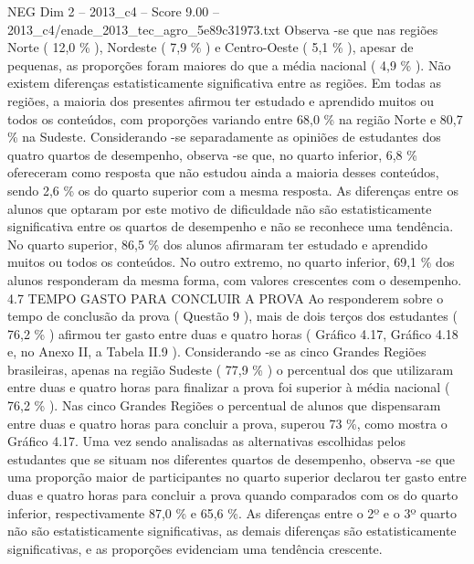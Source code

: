 \begin{textsample}{NEG Dim 2 – 2013\_c4 – Score 9.00 – 2013\_c4/enade\_2013\_tec\_agro\_5e89c31973.txt}
Observa -se que nas regiões Norte ( 12,0 \% ), Nordeste ( 7,9 \% ) e Centro-Oeste ( 5,1 \% ), apesar de pequenas, as proporções foram maiores do que a média nacional ( 4,9 \% ).
Não existem diferenças estatisticamente significativa entre as regiões.
Em todas as regiões, a maioria dos presentes afirmou ter estudado e aprendido muitos ou todos os conteúdos, com proporções variando entre 68,0 \% na região Norte e 80,7 \% na Sudeste.
Considerando -se separadamente as opiniões de estudantes dos quatro quartos de desempenho, observa -se que, no quarto inferior, 6,8 \% ofereceram como resposta que não estudou ainda a maioria desses conteúdos, sendo 2,6 \% os do quarto superior com a mesma resposta.
As diferenças entre os alunos que optaram por este motivo de dificuldade não são estatisticamente significativa entre os quartos de desempenho e não se reconhece uma tendência.
No quarto superior, 86,5 \% dos alunos afirmaram ter estudado e aprendido muitos ou todos os conteúdos.
No outro extremo, no quarto inferior, 69,1 \% dos alunos responderam da mesma forma, com valores crescentes com o desempenho. 4.7 TEMPO GASTO PARA CONCLUIR A PROVA Ao responderem sobre o tempo de conclusão da prova ( Questão 9 ), mais de dois terços dos estudantes ( 76,2 \% ) afirmou ter gasto entre duas e quatro horas ( Gráfico 4.17, Gráfico 4.18 e, no Anexo II, a Tabela II.9 ).
Considerando -se as cinco Grandes Regiões brasileiras, apenas na região Sudeste ( 77,9 \% ) o percentual dos que utilizaram entre duas e quatro horas para finalizar a prova foi superior à média nacional ( 76,2 \% ).
Nas cinco Grandes Regiões o percentual de alunos que dispensaram entre duas e quatro horas para concluir a prova, superou 73 \%, como mostra o Gráfico 4.17.
Uma vez sendo analisadas as alternativas escolhidas pelos estudantes que se situam nos diferentes quartos de desempenho, observa -se que uma proporção maior de participantes no quarto superior declarou ter gasto entre duas e quatro horas para concluir a prova quando comparados com os do quarto inferior, respectivamente 87,0 \% e 65,6 \%.
As diferenças entre o 2º e o 3º quarto não são estatisticamente significativas, as demais diferenças são estatisticamente significativas, e as proporções evidenciam uma tendência crescente.

\end{textsample}
